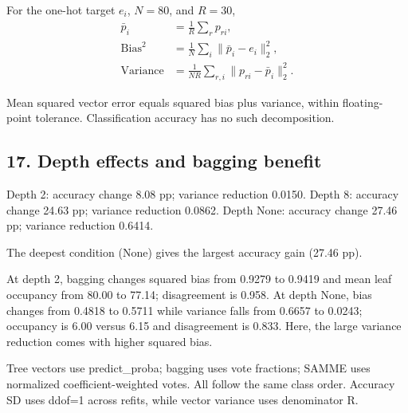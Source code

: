 \documentclass[10pt,twocolumn,letterpaper]{article}
\begin{document}
For the one-hot target $e_i$, $N=80$, and $R=30$,
\begin{align*}
\bar p_i &= \frac{1}{R}\sum_r p_{ri},\\
\mathrm{Bias}^2 &= \frac1N\sum_i\|\bar p_i-e_i\|_2^2,\\
\mathrm{Variance} &= \frac1{NR}\sum_{r,i}\|p_{ri}-\bar p_i\|_2^2.
\end{align*}

Mean squared vector error equals squared bias plus variance, within floating-point tolerance. Classification accuracy has no such decomposition.

\newpage
\subsection*{17. Depth effects and bagging benefit}
Depth 2: accuracy change 8.08 pp; variance reduction 0.0150. Depth 8: accuracy change 24.63 pp; variance reduction 0.0862. Depth None: accuracy change 27.46 pp; variance reduction 0.6414.

The deepest condition (None) gives the largest accuracy gain (27.46 pp).

At depth 2, bagging changes squared bias from 0.9279 to 0.9419 and mean leaf occupancy from 80.00 to 77.14; disagreement is 0.958. At depth None, bias changes from 0.4818 to 0.5711 while variance falls from 0.6657 to 0.0243; occupancy is 6.00 versus 6.15 and disagreement is 0.833. Here, the large variance reduction comes with higher squared bias.

Tree vectors use predict\_proba; bagging uses vote fractions; SAMME uses normalized coefficient-weighted votes. All follow the same class order. Accuracy SD uses ddof=1 across refits, while vector variance uses denominator R.

\clearpage
{}
\end{document}
